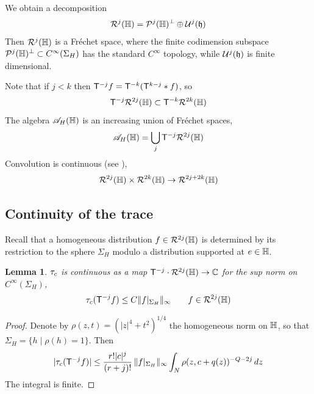 \documentclass[11pt]{amsart}
\theoremstyle{plain}
\newtheorem{lemma}[theorem]{Lemma}
\theoremstyle{definition}
\theoremstyle{remark}
\begin{document}
We obtain a decomposition
\[ \mathcal{R}^{j}(\mathbb{H})=\mathcal{P}^j(\mathbb{H})^\perp\oplus {\mathcal{U}}^j(\mathfrak{h})\]
Then $\mathcal{R}^j(\mathbb{H})$ is a Fr\'echet space,
where the finite codimension subspace $\mathcal{P}^j(\mathbb{H})^\perp\subset C^\infty(\Sigma_H)$ has the standard $C^\infty$ topology,
while ${\mathcal{U}}^j(\mathfrak{h})$ is finite dimensional.

Note that if $j<k$ then $\mathsf{T}^{-j}f=\mathsf{T}^{-k}(\mathsf{T}^{k-j}*f)$, so
\[\mathsf{T}^{-j}\mathcal{R}^{2j}(\mathbb{H})\subset \mathsf{T}^{-k}\mathcal{R}^{2k}(\mathbb{H})\]
The algebra ${\mathscr{A}}_H(\mathbb{H})$ is an increasing  union of Fr\'echet spaces,
\[ {\mathscr{A}}_H(\mathbb{H}) = \bigcup_{j} \mathsf{T}^{-j} \mathcal{R}^{2j}(\mathbb{H})\]
Convolution is continuous (see \cite{CGGP92}), 
\[ \mathcal{R}^{2j}(\mathbb{H})\times\mathcal{R}^{2k}(\mathbb{H})\to\mathcal{R}^{2j+2k}(\mathbb{H})\]


\subsection{Continuity of the trace}

Recall that a homogeneous distribution $f\in \mathcal{R}^{2j}(\mathbb{H})$
is determined by its restriction to the sphere $\Sigma_H$
modulo a distribution supported at $e\in \mathbb{H}$.

\begin{lemma}\label{lem:tau_c continuous}
$\tau_{c}$ is continuous as a map $\mathsf{T}^{-j}\cdot \mathcal{R}^{2j}(\mathbb{H}) \to {\mathbb{C}}$ for the sup norm on $C^\infty(\Sigma_H)$,
\[ \tau_{c}(\mathsf{T}^{-j}f)\le C \|f|_{\Sigma_H}\|_\infty \qquad f\in \mathcal{R}^{2j}(\mathbb{H})  \]
\end{lemma}
\begin{proof}
Denote by $\rho(z,t)=(|z|^4+t^2)^{1/4}$ the homogeneous norm on $\mathbb{H}$,
so that $\Sigma_H=\{h\mid \rho(h)=1\}$.
Then
\[ |\tau_c(\mathsf{T}^{-j}f)| \le \frac{r!|c|^j}{(r+j)!}\, \|f|_{\Sigma_H}\|_\infty \int_N \rho(z,c+q(z))^{-Q-2j}\,dz\]
The integral is finite. 

\end{proof}
\end{document}
